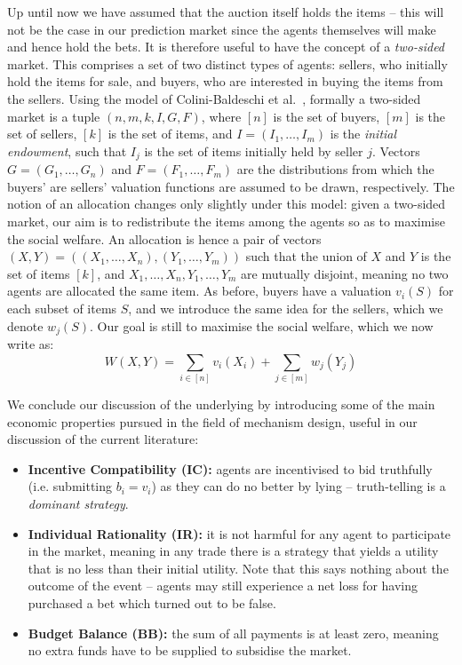 \documentclass[10pt,a4paper]{article}
\theoremstyle{plain}
\theoremstyle{definition}
\begin{document}
	Up until now we have assumed that the auction itself holds the items --
	this will not be the case in our prediction market since the agents
	themselves will make and hence hold the bets. It is therefore useful to
	have the concept of a \emph{two-sided} market. This comprises a set of two
	distinct types of agents: sellers, who initially hold the items for sale,
	and buyers, who are interested in buying the items from the sellers. Using
	the model of Colini-Baldeschi et al.~\cite{ColiniBaldeschi2017}, formally a
	two-sided market is a tuple $(n, m, k, I, G, F)$, where $[n]$ is the set of
	buyers, $[m]$ is the set of sellers, $[k]$ is the set of items, and $I =
	(I_1, \ldots, I_m)$ is the \emph{initial endowment}, such that $I_j$ is the
	set of items initially held by seller $j$. Vectors $G = (G_1, \ldots, G_n)$
	and $F = (F_1, \ldots, F_m)$ are the distributions from which the buyers'
	are sellers' valuation functions are assumed to be drawn, respectively. The
	notion of an allocation changes only slightly under this model: given a
	two-sided market, our aim is to redistribute the items among the agents so
	as to maximise the social welfare. An allocation is hence a pair of vectors
	$(X,Y) = ((X_1, \ldots, X_n), (Y_1, \ldots, Y_m))$ such that the union of
	$X$ and $Y$ is the set of items $[k]$, and $X_1, \ldots, X_n, Y_1, \ldots,
	Y_m$ are mutually disjoint, meaning no two agents are allocated the same
	item. As before, buyers have a valuation $v_i(S)$ for each subset of items
	$S$, and we introduce the same idea for the sellers, which we denote
	$w_j(S)$. Our goal is still to maximise the social welfare, which we now
	write as: \begin{equation*} W(X, Y) = \sum_{i \in [n]} v_i(X_i) + \sum_{j
	\in [m]} w_j(Y_j) \end{equation*}

	We conclude our discussion of the underlying by introducing some of the
	main economic properties pursued in the field of mechanism design, useful
	in our discussion of the current literature:

	\begin{itemize}
		\item \textbf{Incentive Compatibility (IC):} agents are incentivised to
			bid truthfully (i.e. submitting $b_i = v_i$) as they can do no
			better by lying -- truth-telling is a \emph{dominant strategy}.

		\item \textbf{Individual Rationality (IR):} it is not harmful for any
			agent to participate in the market, meaning in any trade there is a
			strategy that yields a utility that is no less than their initial
			utility. Note that this says nothing about the outcome of the event
			-- agents may still experience a net loss for having purchased a
			bet which turned out to be false.

		\item \textbf{Budget Balance (BB):} the sum of all payments is at least
			zero, meaning no extra funds have to be supplied to subsidise the
			market.

	\end{itemize}
\end{document}

